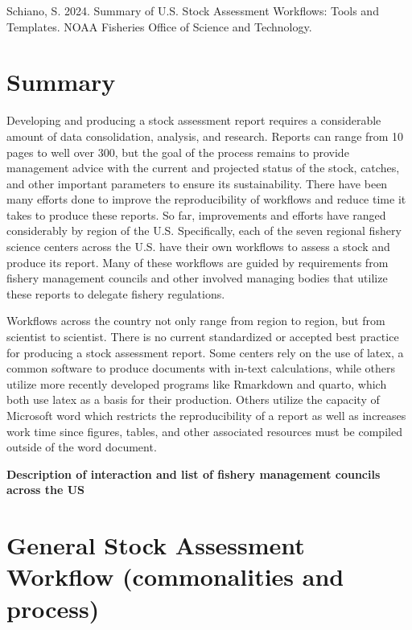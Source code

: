 \documentclass[
  letterpaper,
  oneside,
  open=any]{scrbook}
\begin{document}

Schiano, S. 2024. Summary of U.S. Stock Assessment Workflows: Tools and
Templates. NOAA Fisheries Office of Science and Technology.


\chapter{Summary}\label{summary}

Developing and producing a stock assessment report requires a
considerable amount of data consolidation, analysis, and research.
Reports can range from 10 pages to well over 300, but the goal of the
process remains to provide management advice with the current and
projected status of the stock, catches, and other important parameters
to ensure its sustainability. There have been many efforts done to
improve the reproducibility of workflows and reduce time it takes to
produce these reports. So far, improvements and efforts have ranged
considerably by region of the U.S. Specifically, each of the seven
regional fishery science centers across the U.S. have their own
workflows to assess a stock and produce its report. Many of these
workflows are guided by requirements from fishery management councils
and other involved managing bodies that utilize these reports to
delegate fishery regulations.

Workflows across the country not only range from region to region, but
from scientist to scientist. There is no current standardized or
accepted best practice for producing a stock assessment report. Some
centers rely on the use of latex, a common software to produce documents
with in-text calculations, while others utilize more recently developed
programs like Rmarkdown and quarto, which both use latex as a basis for
their production. Others utilize the capacity of Microsoft word which
restricts the reproducibility of a report as well as increases work time
since figures, tables, and other associated resources must be compiled
outside of the word document.

\textbf{Description of interaction and list of fishery management
councils across the US}


\chapter{General Stock Assessment Workflow (commonalities and
process)}\label{sec-general}
\end{document}
